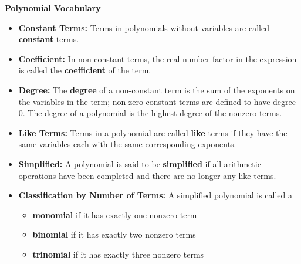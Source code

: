 \documentclass{ximera}
\begin{document}
\begin{definition}\label{polynomialterminology} \textbf{Polynomial Vocabulary}

\begin{itemize}

\item  \textbf{Constant Terms:} Terms in polynomials without variables are called \textbf{constant} terms.

\item  \textbf{Coefficient:}   In non-constant terms, the real number factor in the expression is called the \textbf{coefficient} of the term. 

\item  \textbf{Degree:}  The \textbf{degree} of a non-constant term is the sum of the exponents on the variables in the term; non-zero constant terms are defined to have degree $0$. The degree of a polynomial is the highest degree of the nonzero terms.

\item  \textbf{Like Terms:} Terms in a polynomial are called \textbf{like} terms if they have the same variables each with the same corresponding exponents.

\item  \textbf{Simplified:} A polynomial is said to be \textbf{simplified} if all arithmetic operations have been completed and there are no longer any like terms.

\item  \textbf{Classification by Number of Terms:}  A simplified polynomial  is  called a 

\begin{itemize}

\item   \textbf{monomial} if it has exactly one nonzero term

\item   \textbf{binomial} if it has exactly two nonzero terms

\item   \textbf{trinomial} if it has exactly three nonzero terms

\end{itemize}

\end{itemize}

\end{definition}
\end{document}
